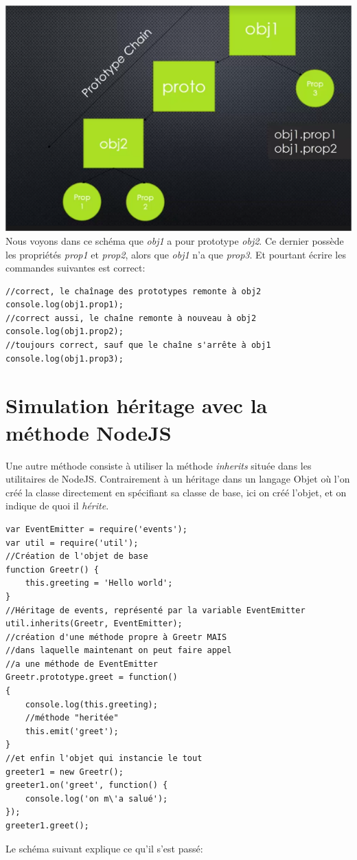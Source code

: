 \documentclass[12pt,oneside]{scrbook}
\begin{document}
\includegraphics{chaine_proto.png}
Nous voyons dans ce schéma que \textit{obj1} a pour prototype \textit{obj2}. Ce dernier possède les propriétés \textit{prop1} et \textit{prop2}, alors que \textit{obj1} n'a que \textit{prop3}. Et pourtant écrire les commandes suivantes est correct:
\begin{verbatim}
//correct, le chaînage des prototypes remonte à obj2
console.log(obj1.prop1);
//correct aussi, le chaîne remonte à nouveau à obj2
console.log(obj1.prop2);
//toujours correct, sauf que le chaîne s'arrête à obj1
console.log(obj1.prop3);
\end{verbatim}
\section{Simulation héritage avec la méthode NodeJS}
Une autre méthode consiste à utiliser la méthode \textit{inherits} située dans les utilitaires de NodeJS. Contrairement à un héritage dans un langage Objet où l'on créé la classe directement en spécifiant sa classe de base, ici on créé l'objet, et on indique de quoi il \textit{hérite}.
\begin{verbatim}
var EventEmitter = require('events');
var util = require('util');
//Création de l'objet de base
function Greetr() {
    this.greeting = 'Hello world';
}
//Héritage de events, représenté par la variable EventEmitter
util.inherits(Greetr, EventEmitter);
//création d'une méthode propre à Greetr MAIS
//dans laquelle maintenant on peut faire appel
//a une méthode de EventEmitter
Greetr.prototype.greet = function()
{
    console.log(this.greeting);
    //méthode "heritée"
    this.emit('greet');
}
//et enfin l'objet qui instancie le tout
greeter1 = new Greetr();
greeter1.on('greet', function() {
    console.log('on m\'a salué');
});
greeter1.greet();
\end{verbatim}
Le schéma suivant explique ce qu'il s'est passé:
\end{document}
